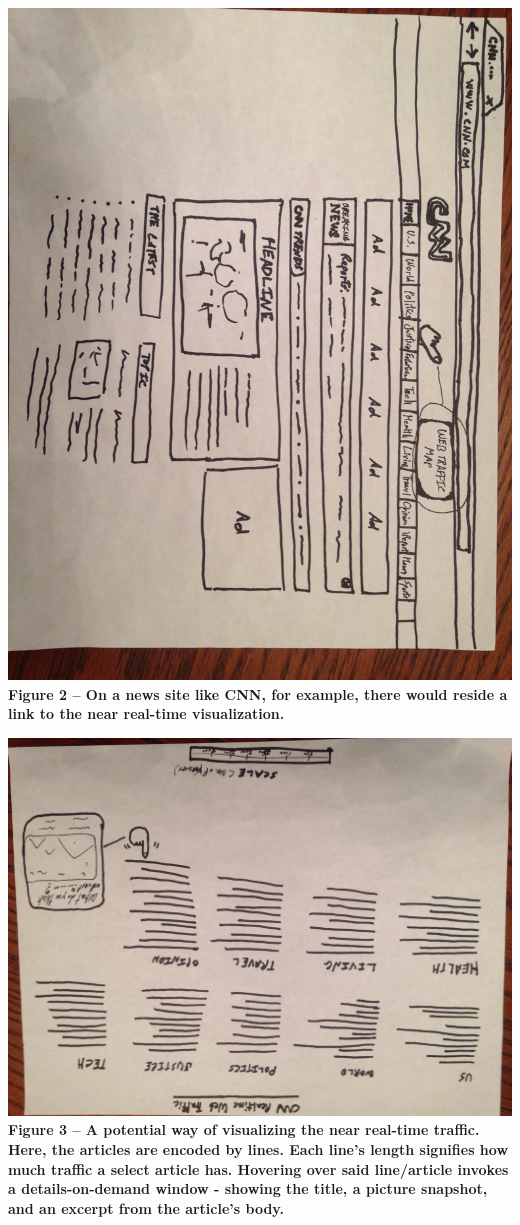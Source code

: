 \documentclass[12pt]{article}
\begin{document}
\noindent\includegraphics[scale=0.2]{img/cnn_example}
\noindent\textbf{Figure 2 -- On a news site like CNN, for example, there would reside a link to the near real-time visualization.}

\noindent\includegraphics[scale=0.2]{img/cnn_categories}
\noindent\textbf{Figure 3 -- A potential way of visualizing the near real-time traffic. Here, the articles are encoded by lines. Each line's length signifies how much traffic a select article has. Hovering over said line/article invokes a details-on-demand window - showing the title, a picture snapshot, and an excerpt from the article's body.}
\end{document}

